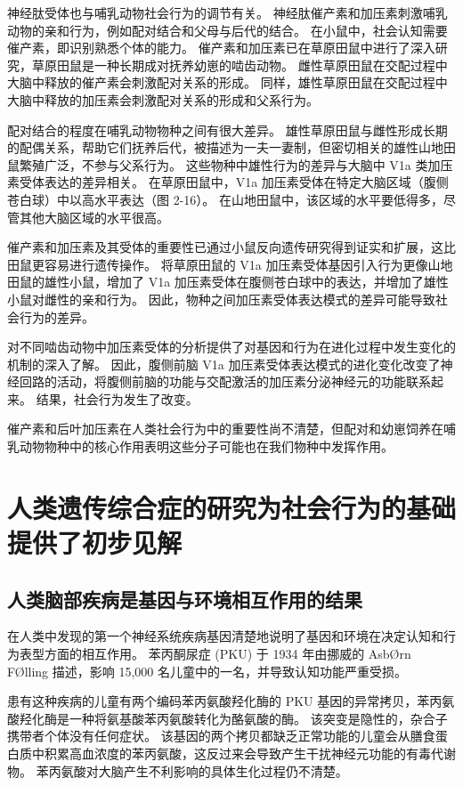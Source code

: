 神经肽受体也与哺乳动物社会行为的调节有关。 
神经肽催产素和加压素刺激哺乳动物的亲和行为，例如配对结合和父母与后代的结合。 
在小鼠中，社会认知需要催产素，即识别熟悉个体的能力。 
催产素和加压素已在草原田鼠中进行了深入研究，草原田鼠是一种长期成对抚养幼崽的啮齿动物。 
雌性草原田鼠在交配过程中大脑中释放的催产素会刺激配对关系的形成。 
同样，雄性草原田鼠在交配过程中大脑中释放的加压素会刺激配对关系的形成和父系行为。


配对结合的程度在哺乳动物物种之间有很大差异。 
雄性草原田鼠与雌性形成长期的配偶关系，帮助它们抚养后代，被描述为一夫一妻制，但密切相关的雄性山地田鼠繁殖广泛，不参与父系行为。 
这些物种中雄性行为的差异与大脑中 V1a 类加压素受体表达的差异相关。 
在草原田鼠中，V1a 加压素受体在特定大脑区域（腹侧苍白球）中以高水平表达（图 2-16）。 
在山地田鼠中，该区域的水平要低得多，尽管其他大脑区域的水平很高。


催产素和加压素及其受体的重要性已通过小鼠反向遗传研究得到证实和扩展，这比田鼠更容易进行遗传操作。 
将草原田鼠的 V1a 加压素受体基因引入行为更像山地田鼠的雄性小鼠，增加了 V1a 加压素受体在腹侧苍白球中的表达，并增加了雄性小鼠对雌性的亲和行为。 
因此，物种之间加压素受体表达模式的差异可能导致社会行为的差异。


对不同啮齿动物中加压素受体的分析提供了对基因和行为在进化过程中发生变化的机制的深入了解。 
因此，腹侧前脑 V1a 加压素受体表达模式的进化变化改变了神经回路的活动，将腹侧前脑的功能与交配激活的加压素分泌神经元的功能联系起来。 
结果，社会行为发生了改变。


催产素和后叶加压素在人类社会行为中的重要性尚不清楚，但配对和幼崽饲养在哺乳动物物种中的核心作用表明这些分子可能也在我们物种中发挥作用。


\section{人类遗传综合症的研究为社会行为的基础提供了初步见解}
\subsection{人类脑部疾病是基因与环境相互作用的结果}
在人类中发现的第一个神经系统疾病基因清楚地说明了基因和环境在决定认知和行为表型方面的相互作用。 
苯丙酮尿症 (PKU) 于 1934 年由挪威的 AsbØrn FØlling 描述，影响 15,000 名儿童中的一名，并导致认知功能严重受损。


患有这种疾病的儿童有两个编码苯丙氨酸羟化酶的 PKU 基因的异常拷贝，苯丙氨酸羟化酶是一种将氨基酸苯丙氨酸转化为酪氨酸的酶。 
该突变是隐性的，杂合子携带者个体没有任何症状。 
该基因的两个拷贝都缺乏正常功能的儿童会从膳食蛋白质中积累高血浓度的苯丙氨酸，这反过来会导致产生干扰神经元功能的有毒代谢物。 
苯丙氨酸对大脑产生不利影响的具体生化过程仍不清楚。


